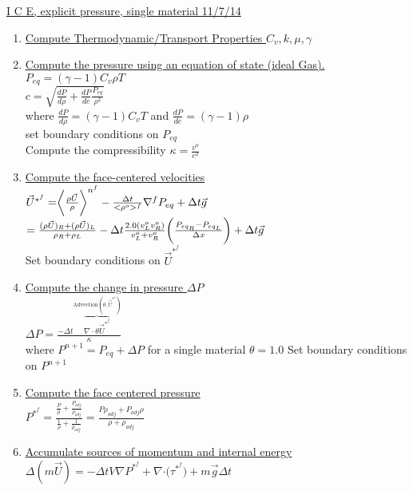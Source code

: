 \documentclass[fleqn]{article}
\newcommand{\B}[1]      {\biggr{#1}}
\newcommand{\U}         {{\vec{U}}}
\newcommand{\rhoM}      {\ensuremath{\rho^{o}}}
\newcommand{\delt}      {\ensuremath{\Delta{t}} }
\newcommand{\sv}[1]     {\ensuremath{v^o_{{#1}} }}
\begin{document}
\setlength{\abovedisplayskip}{0.1in}
\setlength{\mathindent}{0.5in}
\doublespacing
\underline{ I C E, explicit pressure, single material  \hspace{ 0.5in}11/7/14}

\begin{enumerate}
%
\item \underline{Compute Thermodynamic/Transport Properties
$C_v, k, \mu, \gamma$}
%
\item \underline{Compute the pressure using an equation of state (ideal Gas).}\\
$P_{eq} = (\gamma -1) C_v \rho T$\\
$c = \sqrt{ \frac{dP}{d\rho} + \frac{dP}{de} \frac{P_{eq}}{\rho^2} }$\\
where
$\frac{dP}{d\rho} = (\gamma -1) C_v T$ and 
$\frac{dP}{de} = (\gamma - 1) \rho$ \\
set boundary conditions on $P_{eq}$\\
Compute the compressibility $\kappa = \frac{v^o}{c^2}$
%
\item \underline{Compute the face-centered velocities}\\
  $ \vec{U}^{*^{f}} 
    = \B{<} \frac{ \rho \U }{\rho} \B{>}^{n^{f}}
    - \frac{ \delt }{< \rhoM >^f} \nabla^{f} P_{eq}
     + \delt\vec{g} $ \\
$    
   =\frac{(\rho \U)_{R} + (\rho \U)_{L}}{\rho_{R} + \rho_{L}}
   -\delt \frac{2.0 (\sv{L} \sv{R})}  {\sv{L} + \sv{R}}  \B{(} \frac{P_{eq_R} - P_{eq_L}}{\Delta x}\B{)}
   + \delt\vec{g} $ \\
Set boundary conditions on $\vec{U}^{*^{f}}$
%
\item \underline{Compute the change in pressure $\Delta P$}  \\
$     \Delta P =  
              \frac{  - \Delta{t} \overbrace{ \nabla \cdot \theta \vec{U}^{*^{f}} } ^{\text{Advection}(\theta, \vec{U}^{*^{f}}) } }
              {\kappa} $\\
where $P^{n+1} = P_{eq} + \Delta{P}$ for a single material $\theta = 1.0$
Set boundary conditions on $P^{n+1}$
%
\item \underline{Compute the face centered pressure}\\
$ P^{*^{f}} = \frac{\frac{P}{\rho} + \frac{P_{adj}}{\rho_{adj}}}
                     {\frac{1}{\rho} + \frac{1}{\rho_{adj}}}
              =\frac{ {P \rho_{adj}} + {P_{adj} \rho }  }
                 { {\rho} + {\rho_{adj}  }  } $
%
\item \underline{Accumulate sources of momentum and internal energy}\\  
 $\Delta(m\vec{U}) = 
    - \delt V \nabla{ P^{*^f}} 
    + \nabla{ \cdot (\tau^{*^f}})
    + m \vec{g}\delt$
    

\end{enumerate}
\end{document}
